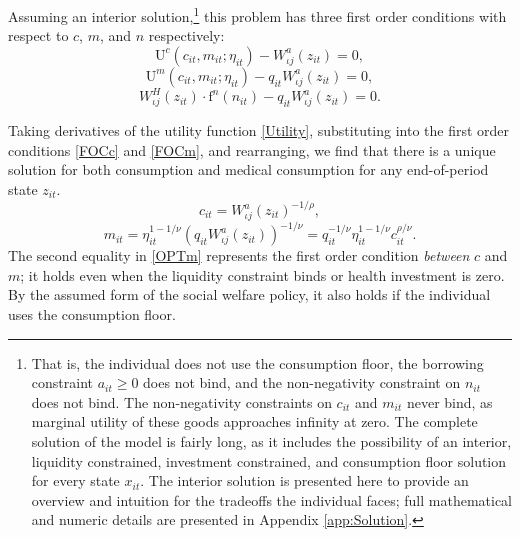 \documentclass[12pt,pdftex,letterpaper]{article}
\newcommand{\PostHealth}{H}
\newcommand{\Utility}{\text{U}}
\newcommand{\PostValue}{W}
\newcommand{\Con}{c}
\newcommand{\Care}{m}
\newcommand{\Invst}{n}
\newcommand{\Assets}{a}
\newcommand{\Copay}{q}
\newcommand{\CRRAcon}{\rho}
\newcommand{\CRRAcare}{\nu}
\newcommand{\MedShk}{\eta}
\newcommand{\HealthProdFunc}{\text{f}}
\newcommand{\State}{x}
\newcommand{\PostState}{z}
\begin{document}
Assuming an interior solution,\footnote{That is, the individual does not use the consumption floor, the borrowing constraint $\Assets_{it} \geq 0$ does not bind, and the non-negativity constraint on $\Invst_{it}$ does not bind.  The non-negativity constraints on $\Con_{it}$ and $\Care_{it}$ never bind, as marginal utility of these goods approaches infinity at zero.  The complete solution of the model is fairly long, as it includes the possibility of an interior, liquidity constrained, investment constrained, and consumption floor solution for every state $\State_{it}$. The interior solution is presented here to provide an overview and intuition for the tradeoffs the individual faces; full mathematical and numeric details are presented in Appendix \ref{app:Solution}.} this problem has three first order conditions with respect to $\Con$, $\Care$, and $\Invst$ respectively:
\begin{equation}\label{FOCc}
\Utility^\Con(\Con_{it},\Care_{it};\MedShk_{it}) - \PostValue_{\iota j}^\Assets(\PostState_{it}) = 0,
\end{equation}
\begin{equation}\label{FOCm}
\Utility^\Care(\Con_{it},\Care_{it};\MedShk_{it}) - \Copay_{it} \PostValue_{\iota j}^\Assets(\PostState_{it}) = 0,
\end{equation}
\begin{equation}\label{FOCn}
\PostValue_{\iota j}^\PostHealth(\PostState_{it}) \cdot \HealthProdFunc^\Invst(\Invst_{it}) - \Copay_{it} \PostValue_{\iota j}^\Assets(\PostState_{it}) = 0.
\end{equation}

Taking derivatives of the utility function \eqref{Utility}, substituting into the first order conditions \eqref{FOCc} and \eqref{FOCm}, and rearranging, we find that there is a unique solution for both consumption and medical consumption for any end-of-period state $\PostState_{it}$.
\begin{equation}\label{OPTc}
\Con_{it} = \PostValue_{\iota j}^\Assets(\PostState_{it})^{-1/\CRRAcon},
\end{equation}
\begin{equation}\label{OPTm}
\Care_{it} = \MedShk_{it}^{1-1/\CRRAcare} \left( \Copay_{it} \PostValue_{\iota j}^\Assets (\PostState_{it}) \right)^{-1/\CRRAcare} = \Copay_{it}^{-1/\CRRAcare} \MedShk_{it}^{1-1/\CRRAcare} \Con_{it}^{\CRRAcon/\CRRAcare}.
\end{equation}
The second equality in \eqref{OPTm} represents the first order condition \textit{between} $\Con$ and $\Care$; it holds even when the liquidity constraint binds or health investment is zero.  By the assumed form of the social welfare policy, it also holds if the individual uses the consumption floor.
\end{document}
